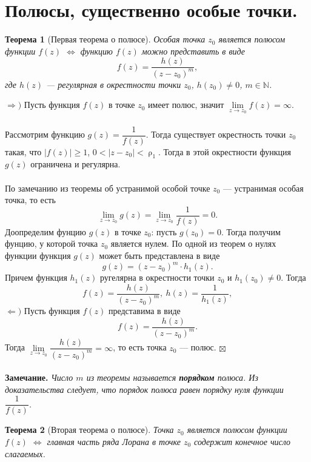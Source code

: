 \documentclass[a4paper, 12pt]{article}
\newenvironment{Proof} %
{\par\noindent{$\blacklozenge$}} %
{\hfill$\scriptstyle\boxtimes$}
\newcommand{\N}{\mathbb{N}}
\renewcommand{\geq}{\geqslant}
\renewcommand{\rho}{\uprho}
\newtheorem*{theorem}{Теорема}
\begin{document}
\section{Полюсы, существенно особые точки.}
\begin{theorem}
	[Первая теорема о полюсе]
	Особая точка $z_0$ является полюсом функции $f(z)$ $\Longleftrightarrow$ функцию $f(z)$ можно представить в виде $$f(z) = \dfrac{h(z)}{(z-z_0)^m},$$ где $h(z)$ --- регулярная в окрестности точки $z_0$, $h(z_0) \ne 0$, $m \in \N$.
\end{theorem}\begin{Proof}
$\Rightarrow)$ Пусть функция $f(z)$ в точке $z_0$ имеет полюс, значит $\lim\limits_{z\to z_0} f(z) = \infty$.\\\\ Рассмотрим функцию $g(z) = \dfrac{1}{f(z)}$. Тогда существует окрестность точки $z_0$ такая, что $|f(z)| \geq 1$, $0<|z-z_0| < \rho_1$. Тогда в этой окрестности функция $g(z)$ ограничена и регулярна.\\\\
По замечанию из теоремы об устранимой особой точке $z_0$ --- устранимая особая точка, то есть $$\lim\limits_{z
\to z_0} g(z) = \lim\limits_{z
\to z_0} \dfrac{1}{f(z)} = 0.$$
Доопределим фунцию $g(z)$ в точке $z_0$: пусть $g(z_0) = 0$. Тогда получим фунцию, у которой точка $z_0$ является нулем. По одной из теорем о нулях функции функция $g(z)$ может быть представлена в виде $$g(z) = (z-z_0)^m\cdot h_1(z).$$
Причем функция $h_1(z)$ ругелярна в окрестности точки $z_0$ и $h_1(z_0) \ne 0$. Тогда $$f(z) = \dfrac{h(z)}{(z-z_0)^m},\ h(z) = \dfrac{1}{h_1(z)},$$
$\Leftarrow)$ Пусть функция $f(z)$ представима в виде $$f(z) = \dfrac{h(z)}{(z-z_0)^m}.$$
Тогда $\lim\limits_{z\to z_0} \dfrac{h(z)}{(z-z_0)^m} = \infty$, то есть точка $z_0$ --- полюс.
\end{Proof}\\\\
\textbf{Замечание.} \textit{Число $m$ из теоремы называется \textbf{порядком} полюса. Из доказательства следует, что порядок полюса равен порядку нуля функции $\dfrac{1}{f(z)}$.}
\begin{theorem}
	[Вторая теорема о полюсе]
	Точка $z_0$ является полюсом функции $f(z)$ $\Longleftrightarrow$ главная часть ряда Лорана в точке $z_0$ содержит конечное число слагаемых.
\end{theorem}
\end{document}

